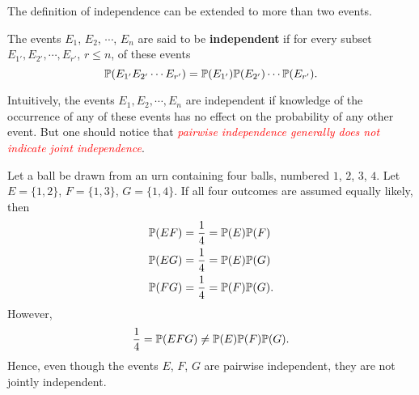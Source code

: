 The definition of independence can be extended to more than two events. 

\begin{definition}
    The events $E_1$, $E_2$, $\cdots$, $E_n$ are said to be \textbf{independent} if for every subset $E_{1'}, E_{2'}, \cdots, E_{r'}$, $r \le n$, of these events 
    \begin{equation*}
        \mathbb{P} (E_{1'}E_{2'} \cdots E_{r'}) = \mathbb{P}(E_{1'}) \mathbb{P}(E_{2'}) \cdots \mathbb{P}(E_{r'}).
    \end{equation*}
\end{definition}

\begin{remark}
    Intuitively, the events $E_1, E_2, \cdots , E_n$ are independent if knowledge of the occurrence of any of these events has no effect on the probability of any other event. But one should notice that \textit{\textcolor{red}{pairwise independence generally does not indicate joint independence}}.
\end{remark}

\begin{example} 
    Let a ball be drawn from an urn containing four balls, numbered $1$, $2$, $3$, $4$. Let $E = \{1, 2\}$, $F = \{1, 3\}$, $G = \{1, 4\}$. If all four outcomes are assumed equally likely, then
    \begin{align*}
        \mathbb{P} (EF) & = \frac{1}{4} = \mathbb{P} (E) \mathbb{P} (F) \\ 
        \mathbb{P} (EG) & = \frac{1}{4} = \mathbb{P} (E) \mathbb{P} (G) \\ 
        \mathbb{P} (FG) & = \frac{1}{4} = \mathbb{P} (F) \mathbb{P} (G).
    \end{align*}
    However, 
    \begin{equation*}
        \frac{1}{4} = \mathbb{P} (EFG) \neq \mathbb{P} (E) \mathbb{P} (F) \mathbb{P}(G).
    \end{equation*}
    Hence, even though the events $E$, $F$, $G$ are pairwise independent, they are not jointly independent.
\end{example}

